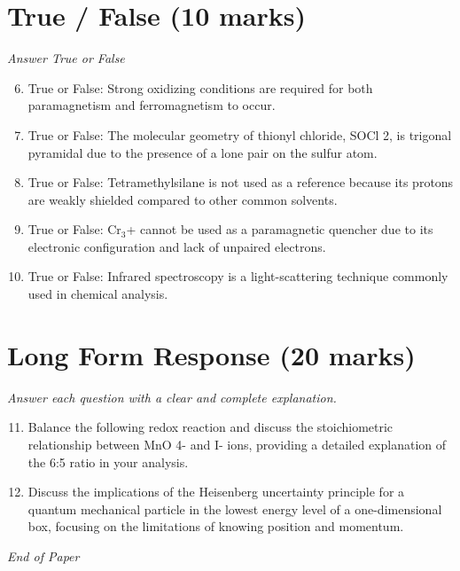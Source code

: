 \documentclass[12pt]{article}
\begin{document}
\section*{True / False (10 marks)}
\textit{Answer True or False}
\begin{enumerate}[label=\arabic*.]
\setcounter{enumi}{5}
\item True or False: Strong oxidizing conditions are required for both paramagnetism and ferromagnetism to occur.
\item True or False: The molecular geometry of thionyl chloride, SOCl 2, is trigonal pyramidal due to the presence of a lone pair on the sulfur atom.
\item True or False: Tetramethylsilane is not used as a reference because its protons are weakly shielded compared to other common solvents.
\item True or False: Cr$_{3}$+ cannot be used as a paramagnetic quencher due to its electronic configuration and lack of unpaired electrons.
\item True or False: Infrared spectroscopy is a light-scattering technique commonly used in chemical analysis.
\end{enumerate}

\section*{Long Form Response (20 marks)}
\textit{Answer each question with a clear and complete explanation.}
\begin{enumerate}[label=\arabic*.]
\setcounter{enumi}{10}
\item Balance the following redox reaction and discuss the stoichiometric relationship between MnO 4- and I- ions, providing a detailed explanation of the 6:5 ratio in your analysis.
\item Discuss the implications of the Heisenberg uncertainty principle for a quantum mechanical particle in the lowest energy level of a one-dimensional box, focusing on the limitations of knowing position and momentum.
\end{enumerate}

\vfill
\noindent\textit{End of Paper}
\end{document}

